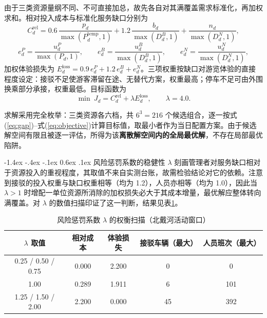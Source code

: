 \documentclass[withoutpreface,bwprint]{cumcmthesis}
\makeatletter
\newcommand{\paperTableWidth}{0.86\textwidth}
\renewcommand\subsubsection{\@startsection{subsubsection}{3}{\z@}%
  {-1.4ex \@plus -.4ex \@minus -.1ex}%
  {0.6ex \@plus .1ex}%
  {\normalfont\normalsize\bfseries}}
\makeatother
\begin{document}
由于三类资源量纲不同、不可直接加总，故先各自对其满覆盖需求标准化，再加权求和。相对投入成本与标准化服务缺口分别为
\begin{equation}\label{eq:cost}
C_d^{\mathrm{rel}}=0.6\,\frac{p_d}{\max(P_d^{\mathrm{temp}},1)}+1.2\,\frac{b_d}{\max(D_d^{B},1)}+\frac{n_d}{\max(D_d^{N},1)},
\end{equation}
\begin{equation}\label{eq:loss}
e_d^{P}=\frac{u_d^{P}}{\max(P_d,1)},\qquad e_d^{B}=\frac{u_d^{B}}{\max(D_d^{B},1)},\qquad e_d^{N}=\frac{u_d^{N}}{\max(D_d^{N},1)},
\end{equation}
加权体验损失为 $E_d^{\mathrm{loss}}=0.9\,e_d^{P}+1.2\,e_d^{B}+e_d^{N}$。三项权重按缺口对游览体验的直接程度设定：接驳不足使游客滞留在途、无替代方案，权重最高；停车不足可由外围换乘部分承接，权重最低。目标函数为
\begin{equation}\label{eq:objective}
\min\ J_d=C_d^{\mathrm{rel}}+\lambda E_d^{\mathrm{loss}},\qquad \lambda=4.0.
\end{equation}

求解采用完全枚举：三类资源各六档，共 $6^3=216$ 个候选组合，逐一按式(\ref{eq:gap})--式(\ref{eq:objective})计算目标值，取最小者作为当日配置方案。由于候选解空间有限且被逐一评估，所得为该\textbf{离散解空间内的全局最优解}，不存在局部最优陷阱。

\subsubsection{风险惩罚系数的稳健性}
$\lambda$ 刻画管理者对服务缺口相对于资源投入的重视程度，其取值不来自实测台账，故需检验结论对它的依赖。注意到接驳的投入权重与缺口权重相等（均为 1.2），人员亦相等（均为 1.0），因此当 $\lambda>1$ 时增配一单位资源所消除的加权损失必大于其成本增量，最优解应整体转向满覆盖。对 $\lambda$ 的数值扫描印证了这一判断，结果见表\ref{tab:q3lambda}。

\begin{table}[H]\centering\small
\renewcommand{\arraystretch}{1.15}\setlength{\tabcolsep}{4pt}
\caption{风险惩罚系数 $\lambda$ 的权衡扫描（北戴河活动窗口）}\label{tab:q3lambda}
\begin{tabular*}{\paperTableWidth}{@{\extracolsep{\fill}}ccccc@{}}\toprule
$\lambda$ 取值 & 相对成本 & 体验损失 & 接驳车辆（最大） & 人员班次（最大）\\ \midrule
0.25 / 0.50 / 0.75 & 0.000 & 2.200 & 0 & 0\\
1.00 & 0.289 & 1.911 & 6 & 101\\
1.25 / 1.50 / 2.00 & 2.200 & 0.000 & 45 & 392\\ \bottomrule
\end{tabular*}
\end{table}
\end{document}
